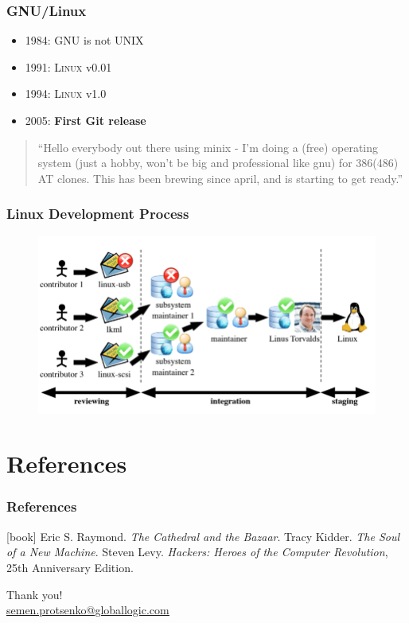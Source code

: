 \documentclass[aspectratio=169]{beamer}
\begin{document}
\begin{frame}
  \frametitle{GNU/Linux}
  \begin{itemize}
    \item 1984: \textsc{GNU} is not \textsc{UNIX}
    \item 1991: \textsc{Linux} v0.01
    \item 1994: \textsc{Linux} v1.0
    \item 2005: \textbf{First Git release}
  \end{itemize}
  \vspace*{5mm}
  \begin{quotation}
    ``Hello everybody out there using minix -
    I'm doing a (free) operating system (just a hobby, won't be big and
    professional like gnu) for 386(486) AT clones. This has been brewing
    since april, and is starting to get ready.''
  \end{quotation}
\end{frame}

\begin{frame}
  \frametitle{Linux Development Process}
    \begin{figure}
      \centering
      \includegraphics[scale=0.4]{images/linux-dev.png}
    \end{figure}
\end{frame}

\section*{References}

\begin{frame}
  \frametitle{References}
  \begin{thebibliography}{}
  [book]
      Eric S. Raymond.
      \newblock \emph{The Cathedral and the Bazaar}.
      Tracy Kidder.
      \newblock \emph{The Soul of a New Machine}.
      Steven Levy.
     \newblock \emph{Hackers: Heroes of the Computer Revolution}, 25th
               Anniversary Edition.
  \end{thebibliography}
\end{frame}

\begin{frame}[standout]
  Thank you! \\
  \vspace{5mm}
	\href{mailto:semen.protsenko@globallogic.com}{\small \underline{semen.protsenko@globallogic.com}}
\end{frame}
\end{document}
